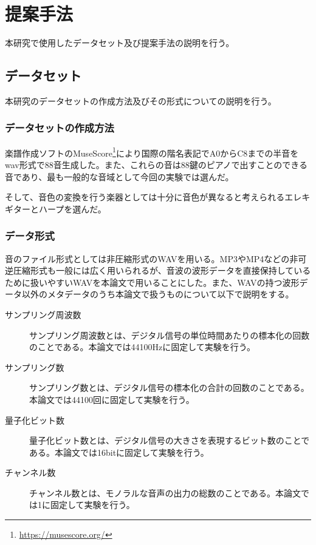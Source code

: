 \chapter{提案手法}

本研究で使用したデータセット及び提案手法の説明を行う。

\section{データセット}

本研究のデータセットの作成方法及びその形式についての説明を行う。

\subsection{データセットの作成方法}

楽譜作成ソフトのMuseScore\footnote{\url{https://musescore.org/}}により国際の階名表記でA0からC8までの半音をwav形式で88音生成した。また、これらの音は88鍵のピアノで出すことのできる音であり、最も一般的な音域として今回の実験では選んだ。

そして、音色の変換を行う楽器としては十分に音色が異なると考えられるエレキギターとハープを選んだ。

\subsection{データ形式}

音のファイル形式としては非圧縮形式のWAVを用いる。MP3やMP4などの非可逆圧縮形式も一般には広く用いられるが、音波の波形データを直接保持しているために扱いやすいWAVを本論文で用いることにした。また、WAVの持つ波形データ以外のメタデータのうち本論文で扱うものについて以下で説明をする。

\begin{description}

\item[サンプリング周波数]\mbox{}

サンプリング周波数とは、デジタル信号の単位時間あたりの標本化の回数のことである。本論文では44100Hzに固定して実験を行う。

\item[サンプリング数]\mbox{}

サンプリング数とは、デジタル信号の標本化の合計の回数のことである。本論文では44100回に固定して実験を行う。

\item[量子化ビット数]\mbox{}

量子化ビット数とは、デジタル信号の大きさを表現するビット数のことである。本論文では16bitに固定して実験を行う。

\item[チャンネル数]\mbox{}

チャンネル数とは、モノラルな音声の出力の総数のことである。本論文では1に固定して実験を行う。

\end{description}

